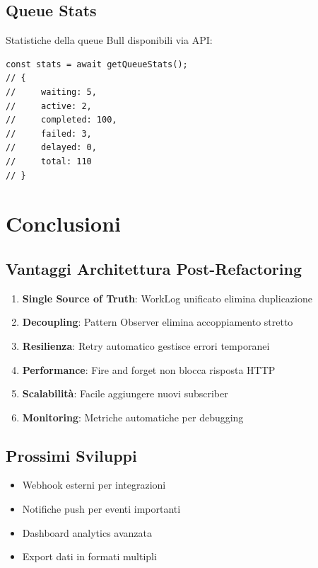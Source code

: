\documentclass[11pt,a4paper]{article}
\begin{document}
\subsection{Queue Stats}

Statistiche della queue Bull disponibili via API:

\begin{lstlisting}[caption=Queue Statistics]
const stats = await getQueueStats();
// {
//     waiting: 5,
//     active: 2,
//     completed: 100,
//     failed: 3,
//     delayed: 0,
//     total: 110
// }
\end{lstlisting}

\section{Conclusioni}

\subsection{Vantaggi Architettura Post-Refactoring}

\begin{enumerate}
    \item \textbf{Single Source of Truth}: WorkLog unificato elimina duplicazione
    \item \textbf{Decoupling}: Pattern Observer elimina accoppiamento stretto
    \item \textbf{Resilienza}: Retry automatico gestisce errori temporanei
    \item \textbf{Performance}: Fire and forget non blocca risposta HTTP
    \item \textbf{Scalabilità}: Facile aggiungere nuovi subscriber
    \item \textbf{Monitoring}: Metriche automatiche per debugging
\end{enumerate}

\subsection{Prossimi Sviluppi}

\begin{itemize}
    \item Webhook esterni per integrazioni
    \item Notifiche push per eventi importanti
    \item Dashboard analytics avanzata
    \item Export dati in formati multipli
\end{itemize}
\end{document}
